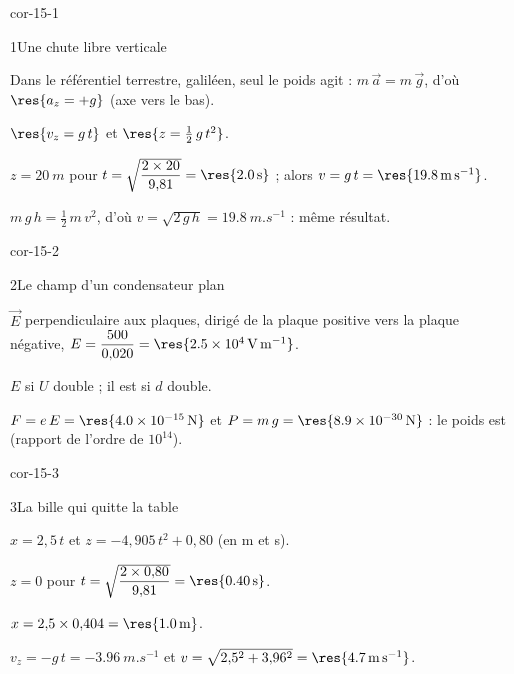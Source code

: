 \corrigesSouples

\begin{blocLivre}{cor-15-1}
\begin{corrige}{1}{Une chute libre verticale}
\begin{questions}
\item Dans le référentiel terrestre, galiléen, seul le poids agit : $m\,\vec{a}=m\,\vec{g}$, d'où $\res{a_z=+g}$ (axe vers
le bas).
\item $\res{v_z=g\,t}$ et $\res{z=\frac12\,g\,t^2}$.
\item $z=\qty{20}{m}$ pour $t=\sqrt{\dfrac{2\times20}{9{,}81}}=\res{\qty{2,0}{s}}$ ; alors $v=g\,t=\res{\qty{19,8}{m.s^{-1}}}$.
\item $m\,g\,h=\frac12\,m\,v^2$, d'où $v=\sqrt{2\,g\,h}=\qty{19,8}{m.s^{-1}}$ : même résultat.
\end{questions}
\end{corrige}
\end{blocLivre}
\begin{blocLivre}{cor-15-2}
\begin{corrige}{2}{Le champ d'un condensateur plan}
\begin{questions}
\item $\vec{E}$ perpendiculaire aux plaques, dirigé de la plaque positive vers la plaque négative,
$E=\dfrac{500}{0{,}020}=\res{\qty{2,5e4}{V.m^{-1}}}$.
\item $E$  si $U$ double ; il est  si $d$ double.
\item $F=e\,E=\res{\qty{4,0e-15}{N}}$ et $P=m\,g=\res{\qty{8,9e-30}{N}}$ : le poids est
 (rapport de l'ordre de $10^{14}$).
\end{questions}
\end{corrige}
\end{blocLivre}
\begin{blocLivre}{cor-15-3}
\begin{corrige}{3}{La bille qui quitte la table}
\begin{questions}
\item $x=2{,}5\,t$ et $z=-4{,}905\,t^2+0{,}80$ (en m et s).
\item $z=0$ pour $t=\sqrt{\dfrac{2\times0{,}80}{9{,}81}}=\res{\qty{0,40}{s}}$.
\item $x=2{,}5\times0{,}404=\res{\qty{1,0}{m}}$.
\item $v_z=-g\,t=\qty{-3,96}{m.s^{-1}}$ et $v=\sqrt{2{,}5^2+3{,}96^2}=\res{\qty{4,7}{m.s^{-1}}}$.
\end{questions}
\end{corrige}
\end{blocLivre}
